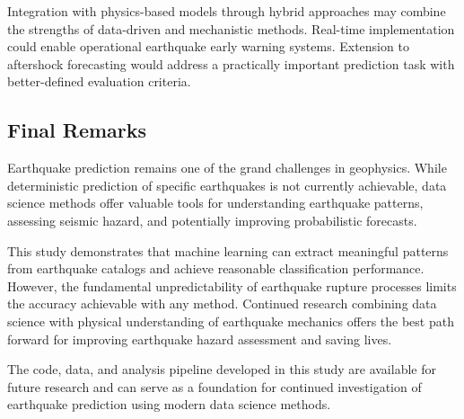 Integration with physics-based models through hybrid approaches may combine the strengths of data-driven and mechanistic methods. Real-time implementation could enable operational earthquake early warning systems. Extension to aftershock forecasting would address a practically important prediction task with better-defined evaluation criteria.

\subsection{Final Remarks}

Earthquake prediction remains one of the grand challenges in geophysics. While deterministic prediction of specific earthquakes is not currently achievable, data science methods offer valuable tools for understanding earthquake patterns, assessing seismic hazard, and potentially improving probabilistic forecasts.

This study demonstrates that machine learning can extract meaningful patterns from earthquake catalogs and achieve reasonable classification performance. However, the fundamental unpredictability of earthquake rupture processes limits the accuracy achievable with any method. Continued research combining data science with physical understanding of earthquake mechanics offers the best path forward for improving earthquake hazard assessment and saving lives.

The code, data, and analysis pipeline developed in this study are available for future research and can serve as a foundation for continued investigation of earthquake prediction using modern data science methods.

